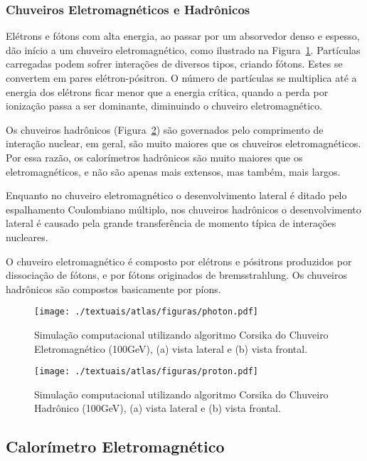 \subsubsection{Chuveiros Eletromagnéticos e Hadrônicos}

Elétrons e fótons com alta energia, ao passar por um absorvedor denso e espesso, dão início a um chuveiro eletromagnético, como ilustrado na Figura~\ref{fig:3T08}. Partículas carregadas podem sofrer interações de diversos tipos, criando fótons. Estes se convertem em pares elétron-pósitron. O número de partículas se multiplica até a energia dos elétrons ficar menor que a energia crítica, quando a perda por ionização passa a ser dominante, diminuindo o chuveiro eletromagnético.

Os chuveiros hadrônicos (Figura~\ref{fig:3T09}) são governados pelo comprimento de interação nuclear, em geral, são muito maiores que os chuveiros eletromagnéticos. Por essa razão, os calorímetros hadrônicos são muito maiores  que os eletromagnéticos, e não são apenas mais extensos, mas também, mais largos.

Enquanto no chuveiro eletromagnético o desenvolvimento lateral é ditado pelo espalhamento Coulombiano múltiplo, nos chuveiros hadrônicos o desenvolvimento lateral é causado pela grande transferência de momento típica de interações nucleares.

O chuveiro eletromagnético é composto por elétrons e pósitrons produzidos por dissociação de fótons, e por fótons originados de bremsstrahlung. Os chuveiros hadrônicos são compostos basicamente por píons.

\begin{figure}[h!]
	\centering
	\texttt{[image: ./textuais/atlas/figuras/photon.pdf]}\\
	\caption{Simulação computacional utilizando algoritmo Corsika do Chuveiro Eletromagnético (100GeV), (a) vista lateral e (b) vista frontal.}
	\label{fig:3T08}
\end{figure}

\begin{figure}[h!]
	\centering
	\texttt{[image: ./textuais/atlas/figuras/proton.pdf]}\\
	\caption{Simulação computacional utilizando algoritmo Corsika do Chuveiro Hadrônico (100GeV), (a) vista lateral e (b) vista frontal.}
	\label{fig:3T09}
\end{figure}

\subsection{Calorímetro Eletromagnético}

